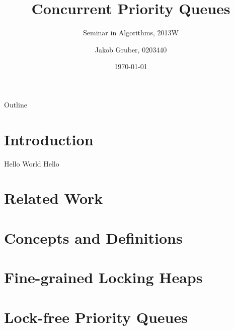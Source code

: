 \documentclass{beamer}
\title{Concurrent Priority Queues}
\subtitle{Seminar in Algorithms, 2013W}
\author{Jakob Gruber, 0203440}
\date{\today}
\begin{document}
\maketitle

\begin{frame}{Outline}
\begin{minipage}[t][10em][t]{\linewidth}
\tableofcontents
\end{minipage}
\end{frame}

\section{Introduction}

\begin{frame}{Hello World}
Hello
\end{frame}

\section{Related Work}

\section{Concepts and Definitions}

\section{Fine-grained Locking Heaps}

\section{Lock-free Priority Queues}
\end{document}
